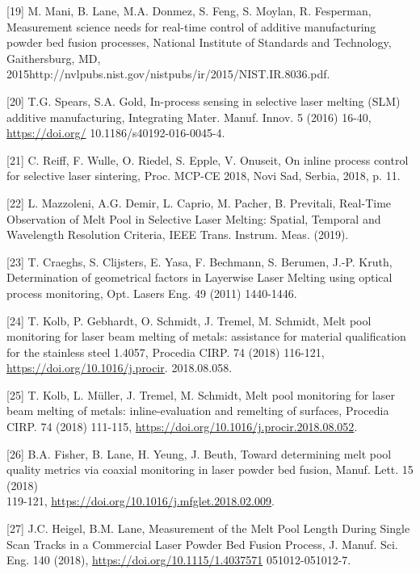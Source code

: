 \documentclass[10pt]{article}
\begin{document}
[19] M. Mani, B. Lane, M.A. Donmez, S. Feng, S. Moylan, R. Fesperman, Measurement science needs for real-time control of additive manufacturing powder bed fusion processes, National Institute of Standards and Technology, Gaithersburg, MD, 2015http://nvlpubs.nist.gov/nistpubs/ir/2015/NIST.IR.8036.pdf.

[20] T.G. Spears, S.A. Gold, In-process sensing in selective laser melting (SLM) additive manufacturing, Integrating Mater. Manuf. Innov. 5 (2016) 16-40, \href{https://doi.org/}{https://doi.org/} 10.1186/s40192-016-0045-4.

[21] C. Reiff, F. Wulle, O. Riedel, S. Epple, V. Onuseit, On inline process control for selective laser sintering, Proc. MCP-CE 2018, Novi Sad, Serbia, 2018, p. 11.

[22] L. Mazzoleni, A.G. Demir, L. Caprio, M. Pacher, B. Previtali, Real-Time Observation of Melt Pool in Selective Laser Melting: Spatial, Temporal and Wavelength Resolution Criteria, IEEE Trans. Instrum. Meas. (2019).

[23] T. Craeghs, S. Clijsters, E. Yasa, F. Bechmann, S. Berumen, J.-P. Kruth, Determination of geometrical factors in Layerwise Laser Melting using optical process monitoring, Opt. Lasers Eng. 49 (2011) 1440-1446.

[24] T. Kolb, P. Gebhardt, O. Schmidt, J. Tremel, M. Schmidt, Melt pool monitoring for laser beam melting of metals: assistance for material qualification for the stainless steel 1.4057, Procedia CIRP. 74 (2018) 116-121, \href{https://doi.org/10.1016/j.procir}{https://doi.org/10.1016/j.procir}. 2018.08.058.

[25] T. Kolb, L. Müller, J. Tremel, M. Schmidt, Melt pool monitoring for laser beam melting of metals: inline-evaluation and remelting of surfaces, Procedia CIRP. 74 (2018) 111-115, \href{https://doi.org/10.1016/j.procir.2018.08.052}{https://doi.org/10.1016/j.procir.2018.08.052}.

[26] B.A. Fisher, B. Lane, H. Yeung, J. Beuth, Toward determining melt pool quality metrics via coaxial monitoring in laser powder bed fusion, Manuf. Lett. 15 (2018)\\
119-121, \href{https://doi.org/10.1016/j.mfglet.2018.02.009}{https://doi.org/10.1016/j.mfglet.2018.02.009}.

[27] J.C. Heigel, B.M. Lane, Measurement of the Melt Pool Length During Single Scan Tracks in a Commercial Laser Powder Bed Fusion Process, J. Manuf. Sci. Eng. 140 (2018), \href{https://doi.org/10.1115/1.4037571}{https://doi.org/10.1115/1.4037571} 051012-051012-7.
\end{document}
